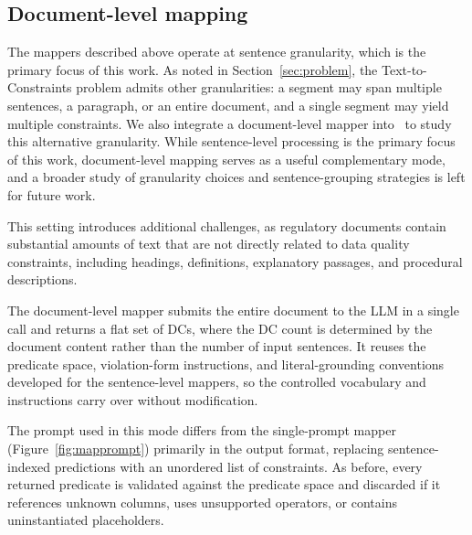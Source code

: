 \subsection{Document-level mapping}
\label{sec:mapper:document}

The mappers described above operate at sentence granularity, which is the primary focus of this work. As noted in Section~\ref{sec:problem}, the Text-to-Constraints problem admits other granularities: a segment may span multiple sentences, a paragraph, or an entire document, and a single segment may yield multiple constraints. We also integrate a document-level mapper into \system\ to study this alternative granularity. While sentence-level processing is the primary focus of this work, document-level mapping serves as a useful complementary mode, and a broader study of granularity choices and sentence-grouping strategies is left for future work.

This setting introduces additional challenges, as regulatory documents contain substantial amounts of text that are not directly related to data quality constraints, including headings, definitions, explanatory passages, and procedural descriptions.

The document-level mapper submits the entire document to the LLM in a single call and
returns a flat set of DCs, where the DC count is determined by the document
content rather than the number of input sentences. It reuses the predicate space,
violation-form instructions, and literal-grounding conventions developed for the
sentence-level mappers, so the controlled vocabulary and instructions carry over
without modification. 

The prompt used in this mode differs from the single-prompt mapper (Figure~\ref{fig:mapprompt}) primarily in the output format, replacing sentence-indexed predictions with an unordered list of constraints. As before, every returned predicate is validated against the predicate space and discarded if it references unknown columns, uses unsupported operators, or contains uninstantiated placeholders.




